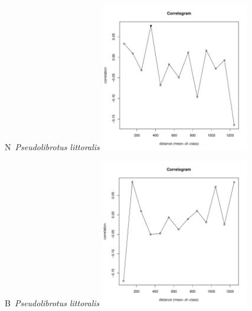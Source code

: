 \documentclass[12pt, a4paper]{disser}
\begin{document}
\begin{figure}[h]
	
	\begin{minipage}[b]{.46\linewidth}
	\begin{center}
	{\small N~{\it Pseudolibrotus littoralis}}
	\includegraphics[width=65mm]{../Barenc_Sea/distribution_Moran/Plyazh0812_moran_N_Pseudolibrotus_littoralis_.pdf}

	\end{center}
	\end{minipage}
	\hfil %
	\begin{minipage}[b]{.46\linewidth}
	\begin{center}
	{\small B~{\it Pseudolibrotus littoralis}}
		\includegraphics[width=65mm]{../Barenc_Sea/distribution_Moran/Plyazh0812_moran_B_Pseudolibrotus_littoralis_.pdf}
	\end{center}
	\end{minipage}






\end{figure}
\end{document}

